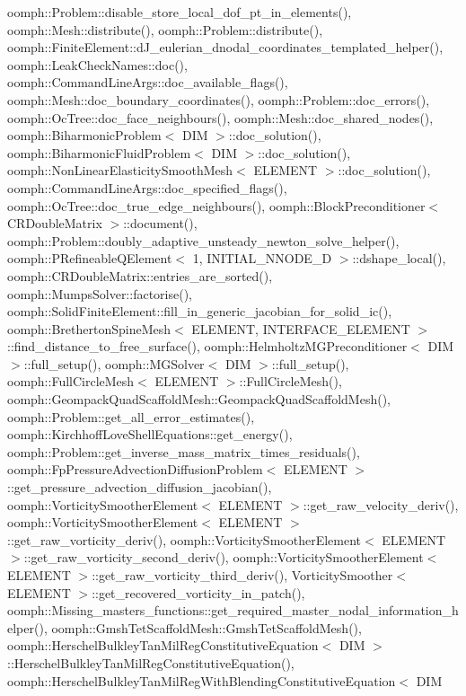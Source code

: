oomph\+::\+Problem\+::disable\+\_\+store\+\_\+local\+\_\+dof\+\_\+pt\+\_\+in\+\_\+elements(), oomph\+::\+Mesh\+::distribute(), oomph\+::\+Problem\+::distribute(), oomph\+::\+Finite\+Element\+::d\+J\+\_\+eulerian\+\_\+dnodal\+\_\+coordinates\+\_\+templated\+\_\+helper(), oomph\+::\+Leak\+Check\+Names\+::doc(), oomph\+::\+Command\+Line\+Args\+::doc\+\_\+available\+\_\+flags(), oomph\+::\+Mesh\+::doc\+\_\+boundary\+\_\+coordinates(), oomph\+::\+Problem\+::doc\+\_\+errors(), oomph\+::\+Oc\+Tree\+::doc\+\_\+face\+\_\+neighbours(), oomph\+::\+Mesh\+::doc\+\_\+shared\+\_\+nodes(), oomph\+::\+Biharmonic\+Problem$<$ D\+I\+M $>$\+::doc\+\_\+solution(), oomph\+::\+Biharmonic\+Fluid\+Problem$<$ D\+I\+M $>$\+::doc\+\_\+solution(), oomph\+::\+Non\+Linear\+Elasticity\+Smooth\+Mesh$<$ E\+L\+E\+M\+E\+N\+T $>$\+::doc\+\_\+solution(), oomph\+::\+Command\+Line\+Args\+::doc\+\_\+specified\+\_\+flags(), oomph\+::\+Oc\+Tree\+::doc\+\_\+true\+\_\+edge\+\_\+neighbours(), oomph\+::\+Block\+Preconditioner$<$ C\+R\+Double\+Matrix $>$\+::document(), oomph\+::\+Problem\+::doubly\+\_\+adaptive\+\_\+unsteady\+\_\+newton\+\_\+solve\+\_\+helper(), oomph\+::\+P\+Refineable\+Q\+Element$<$ 1, I\+N\+I\+T\+I\+A\+L\+\_\+\+N\+N\+O\+D\+E\+\_\+D $>$\+::dshape\+\_\+local(), oomph\+::\+C\+R\+Double\+Matrix\+::entries\+\_\+are\+\_\+sorted(), oomph\+::\+Mumps\+Solver\+::factorise(), oomph\+::\+Solid\+Finite\+Element\+::fill\+\_\+in\+\_\+generic\+\_\+jacobian\+\_\+for\+\_\+solid\+\_\+ic(), oomph\+::\+Bretherton\+Spine\+Mesh$<$ E\+L\+E\+M\+E\+N\+T, I\+N\+T\+E\+R\+F\+A\+C\+E\+\_\+\+E\+L\+E\+M\+E\+N\+T $>$\+::find\+\_\+distance\+\_\+to\+\_\+free\+\_\+surface(), oomph\+::\+Helmholtz\+M\+G\+Preconditioner$<$ D\+I\+M $>$\+::full\+\_\+setup(), oomph\+::\+M\+G\+Solver$<$ D\+I\+M $>$\+::full\+\_\+setup(), oomph\+::\+Full\+Circle\+Mesh$<$ E\+L\+E\+M\+E\+N\+T $>$\+::\+Full\+Circle\+Mesh(), oomph\+::\+Geompack\+Quad\+Scaffold\+Mesh\+::\+Geompack\+Quad\+Scaffold\+Mesh(), oomph\+::\+Problem\+::get\+\_\+all\+\_\+error\+\_\+estimates(), oomph\+::\+Kirchhoff\+Love\+Shell\+Equations\+::get\+\_\+energy(), oomph\+::\+Problem\+::get\+\_\+inverse\+\_\+mass\+\_\+matrix\+\_\+times\+\_\+residuals(), oomph\+::\+Fp\+Pressure\+Advection\+Diffusion\+Problem$<$ E\+L\+E\+M\+E\+N\+T $>$\+::get\+\_\+pressure\+\_\+advection\+\_\+diffusion\+\_\+jacobian(), oomph\+::\+Vorticity\+Smoother\+Element$<$ E\+L\+E\+M\+E\+N\+T $>$\+::get\+\_\+raw\+\_\+velocity\+\_\+deriv(), oomph\+::\+Vorticity\+Smoother\+Element$<$ E\+L\+E\+M\+E\+N\+T $>$\+::get\+\_\+raw\+\_\+vorticity\+\_\+deriv(), oomph\+::\+Vorticity\+Smoother\+Element$<$ E\+L\+E\+M\+E\+N\+T $>$\+::get\+\_\+raw\+\_\+vorticity\+\_\+second\+\_\+deriv(), oomph\+::\+Vorticity\+Smoother\+Element$<$ E\+L\+E\+M\+E\+N\+T $>$\+::get\+\_\+raw\+\_\+vorticity\+\_\+third\+\_\+deriv(), Vorticity\+Smoother$<$ E\+L\+E\+M\+E\+N\+T $>$\+::get\+\_\+recovered\+\_\+vorticity\+\_\+in\+\_\+patch(), oomph\+::\+Missing\+\_\+masters\+\_\+functions\+::get\+\_\+required\+\_\+master\+\_\+nodal\+\_\+information\+\_\+helper(), oomph\+::\+Gmsh\+Tet\+Scaffold\+Mesh\+::\+Gmsh\+Tet\+Scaffold\+Mesh(), oomph\+::\+Herschel\+Bulkley\+Tan\+Mil\+Reg\+Constitutive\+Equation$<$ D\+I\+M $>$\+::\+Herschel\+Bulkley\+Tan\+Mil\+Reg\+Constitutive\+Equation(), oomph\+::\+Herschel\+Bulkley\+Tan\+Mil\+Reg\+With\+Blending\+Constitutive\+Equation$<$ D\+I\+M 